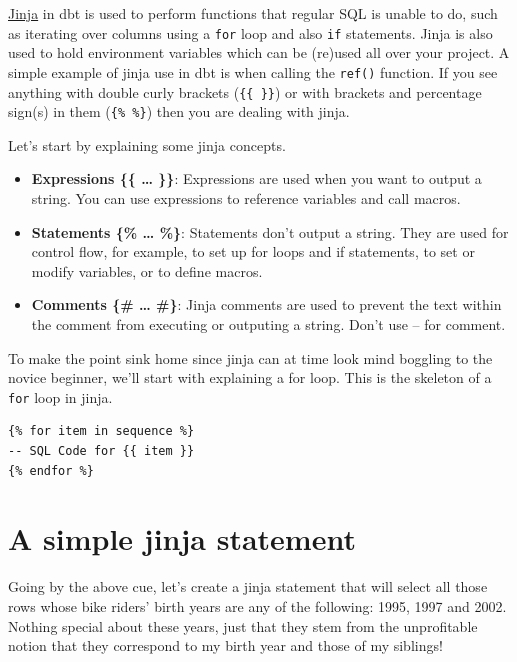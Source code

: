 \documentclass[
]{book}
\begin{document}
\href{https://docs.getdbt.com/docs/build/jinja-macros}{Jinja} in dbt is used to perform functions that regular SQL is unable to do, such as iterating over columns using a \texttt{for} loop and also \texttt{if} statements. Jinja is also used to hold environment variables which can be (re)used all over your project. A simple example of jinja use in dbt is when calling the \texttt{ref()} function. If you see anything with double curly brackets (\texttt{\{\{\ \}\}}) or with brackets and percentage sign(s) in them (\texttt{\{\%\ \%\}}) then you are dealing with jinja.

Let's start by explaining some jinja concepts.

\begin{itemize}
\item
  \textbf{Expressions \{\{ \ldots{} \}\}}: Expressions are used when you want to output a string. You can use expressions to reference variables and call macros.
\item
  \textbf{Statements \{\% \ldots{} \%\}}: Statements don't output a string. They are used for control flow, for example, to set up for loops and if statements, to set or modify variables, or to define macros.
\item
  \textbf{Comments \{\# \ldots{} \#\}}: Jinja comments are used to prevent the text within the comment from executing or outputing a string. Don't use -- for comment.
\end{itemize}

To make the point sink home since jinja can at time look mind boggling to the novice beginner, we'll start with explaining a for loop. This is the skeleton of a \texttt{for} loop in jinja.

\begin{verbatim}
{% for item in sequence %}
-- SQL Code for {{ item }}
{% endfor %}
\end{verbatim}

\hypertarget{a-simple-jinja-statement}{%
\section{A simple jinja statement}\label{a-simple-jinja-statement}}

Going by the above cue, let's create a jinja statement that will select all those rows whose bike riders' birth years are any of the following: 1995, 1997 and 2002. Nothing special about these years, just that they stem from the unprofitable notion that they correspond to my birth year and those of my siblings!
\end{document}
